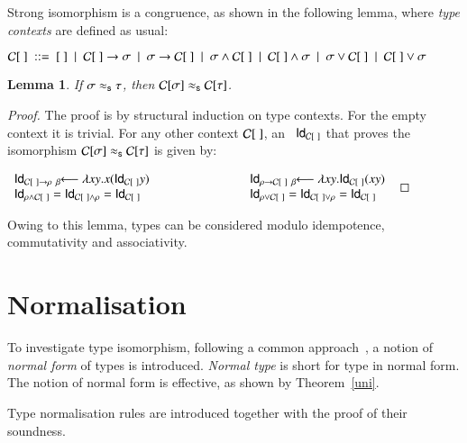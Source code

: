 \documentclass[UKenglish]{eptcs}
\newtheorem{lemma}[fact]{Lemma}
\newcommand{\tA}{\sigma}       \newcommand{\tB}{\tau}
\newcommand{\tC}{\rho}
\newcommand{\tS}{\sigma}       \newcommand{\tT}{\tau}
\newcommand{\C}[1]{{\cal C}[#1]}
\newcommand{\id}{{\sf Id}}
\newcommand{\tob}{\;{_\beta}\!\!\longleftarrow}
\newcommand{\labelx}[1]{\label{#1}}
\newcommand{\isos}{\approx_{\sf s}}
\newcommand{\myformula}[1]{\\[0.5pt]\centerline{#1}}
\begin{document}
Strong isomorphism is a congruence, as shown in the following lemma, where
\emph{ type contexts} are defined as usual:
\myformula{$\C{~}~::=~[~] ~\mid ~\C{~}\to\tS~\mid~ \tS\to\C{~}~\mid~ \tS\wedge\C{~}~\mid~\C{~}\wedge\tS ~\mid~ \tS\vee\C{~}~\mid~\C{~}\vee\tS$}


\begin{lemma}\labelx{in}
If $\tA\isos\tB$, then $\C\tA\isos\C\tB$.
\end{lemma}
\begin{proof}
The proof is by structural induction on type contexts. For the empty context it is trivial.
For any other context $\C{~}$,  an \fhi\ $\id_{\C{~}}$ that proves the isomorphism $\C\tA \isos \C\tB$ is given by:
\myformula{$\begin{array}{lll}
 \id_{\C{~}\to\tC}\tob\lambda xy.x(\id_{\C{~}} y)&\qquad\qquad\qquad&
\id_{ \tC\to\C{~}}\tob\lambda xy.\id_{\C{~}}(xy)\\
\id_{\tC \wedge\C{~}} = \id_{\C{~} \wedge \tC} = \id_{\C{~}}&&
\id_{\tC \vee\C{~}} = \id_{\C{~} \vee \tC} = \id_{\C{~}}
\end{array}$}\vspace{-3mm}
\end{proof}


Owing to this lemma, types can be considered modulo idempotence, commutativity and associativity.




\section{Normalisation}\labelx{nos}
To investigate type isomorphism, following  a common approach~\cite{BruceDicosmoLongo92,MSCSSurvey05,DDGT10,CDMZ13},
      a notion of \emph{normal form} of types is introduced. {\em Normal type} is short for type in normal form. The notion of normal form is effective, as shown by Theorem~\ref{uni}.


\smallskip




Type normalisation rules are introduced together with the proof of their soundness.
\end{document}
